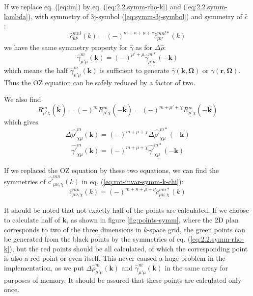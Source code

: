If we replace eq. (\ref{eq:im}) by eq. (\ref{eq:2.2.symm-rho-k})
and (\ref{eq:2.2.symm-lambda}), with symmetry of 3j-symbol (\ref{eq:symm-3j-symbol})
and symmetry of $\hat{c}$ \citep{Blum_I}:
\begin{equation}
\hat{c}_{\mu\nu}^{mnl}(k)=\left(-\right)^{m+n+\mu+\nu}\hat{c}_{\underline{\mu}\underline{\nu}}^{mnl*}(k)
\end{equation}
we have the same symmetry property for $\hat{\gamma}$ as for $\Delta\hat{\rho}$:
\begin{equation}
\hat{\gamma}_{\mu'\mu}^{m}(\mathbf{k})=\left(-\right)^{\mu'+\mu}\hat{\gamma}_{\underline{\mu'}\underline{\mu}}^{m*}(-\mathbf{k})
\end{equation}
which means the half $\hat{\gamma}_{\mu'\mu}^{m}(\mathbf{k})$ is
sufficient to generate $\hat{\gamma}(\mathbf{k},\mathbf{\Omega})$
or $\gamma(\mathbf{r},\mathbf{\Omega})$. Thus the \acs{OZ} equation
can be safely reduced by a factor of two. 

We also find
\begin{equation}
R_{\mu'\chi}^{m}(\hat{\mathbf{k}})=(-)^{m}R_{\mu'\underline{\chi}}^{m}(-\hat{\mathbf{k}})=(-)^{m+\mu'+\chi}R_{\underline{\mu'}\chi}^{m}(-\hat{\mathbf{k}})\label{eq:3}
\end{equation}
which gives
\begin{equation}
\Delta\hat{\rho'}_{\chi\mu}^{m}(\mathbf{k})=(-)^{m+\mu+\chi}\Delta\hat{\rho'}_{\chi\underline{\mu}}^{m*}(-\mathbf{k})
\end{equation}
\begin{equation}
\hat{\gamma'}_{\chi\mu}^{m}(\mathbf{k})=(-)^{m+\mu+\chi}\hat{\gamma'}_{\chi\underline{\mu}}^{m*}(-\mathbf{k})
\end{equation}

If we replaced the \acs{OZ} equation by these two equations, we can
find the symmetries of $\hat{c'}_{\mu\nu,\chi}^{mn}(k)$ in eq. (\ref{eq:rot-invar-symm-k-chi}):
\begin{equation}
\hat{c}_{\mu\nu,\chi}^{mn}(k)=\left(-\right)^{m+n+\mu+\nu}\hat{c}_{\underline{\mu}\underline{\nu},\chi}^{mn*}(k)
\end{equation}

It should be noted that not exactly half of the points are calculated.
If we choose to calculate half of $\mathbf{k}$, as shown in figure
\ref{fig:points-symm}, where the 2D plan corresponds to two of the three
dimensions in $k$-space grid, the green points can be generated from
the black points by the symmetries of eq. (\ref{eq:2.2.symm-rho-k}),
but the red points should be all calculated, of which the corresponding
point is also a red point or even itself. This never caused a huge
problem in the implementation, as we put $\Delta\hat{\rho}_{\mu'\mu}^{m}(\mathbf{k})$
and $\hat{\gamma}_{\mu'\mu}^{m}(\mathbf{k})$ in the same array for
purposes of memory. It should be assured that these points are calculated
only once.

